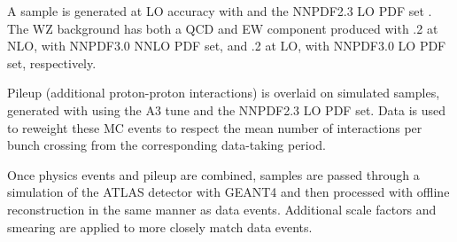 A \tty sample is generated at \ac{LO} accuracy with \madgraphfiveamc and
the NNPDF2.3 \ac{LO} \ac{PDF} set \cite{NNPDF2dot3}.
The WZ background has both a \ac{QCD} and \ac{EW} component produced with
.2 \cite{sherpa2dot2}
at \ac{NLO}, with NNPDF3.0 \ac{NNLO} \ac{PDF} set, and
.2 \cite{madgraph5amc}
at \ac{LO}, with NNPDF3.0 \ac{LO} \ac{PDF} set, respectively.

Pileup (additional proton-proton interactions) is overlaid on simulated samples,
generated with  using the A3 tune \cite{A3tune}
and the NNPDF2.3 \ac{LO} \ac{PDF} set.
Data is used to reweight these \ac{MC} events to respect the mean number of
interactions per bunch crossing from the corresponding data-taking period.

Once physics events and pileup are combined, samples are passed through a
simulation of the \ac{ATLAS} detector with GEANT4 \cite{ATLASsim1,geant4}
and then processed with offline reconstruction in the same manner as data
events. Additional scale factors and smearing are applied to more closely match
data events.
